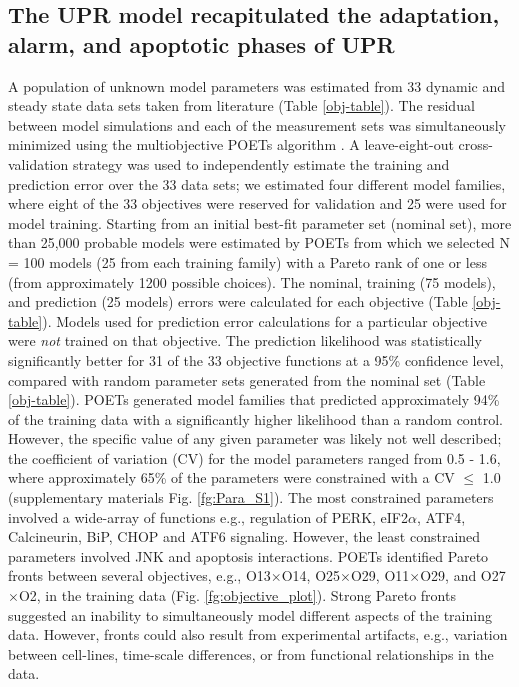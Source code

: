 \documentclass[fleqn,10pt]{wlscirep}
\begin{document}
\subsection*{The UPR model recapitulated the adaptation, alarm, and apoptotic phases of UPR}
A population of unknown model parameters was estimated from 33 dynamic and steady state data sets taken from literature (Table \ref{obj-table}).
The residual between model simulations and each of the measurement sets was simultaneously minimized using the multiobjective POETs algorithm \cite{Song:2010ij}.
A leave-eight-out cross-validation strategy was used to independently estimate the training and prediction error over the 33 data sets; we estimated four different model families,
where eight of the 33 objectives were reserved for validation and 25 were used for model training.
Starting from an initial best-fit parameter set (nominal set), more than 25,000 probable models were estimated by POETs from which we selected N = 100 models (25 from each training family) with a Pareto rank of one or less (from approximately 1200 possible choices).
The nominal, training (75 models), and prediction (25 models) errors were calculated for each objective (Table \ref{obj-table}).
Models used for prediction error calculations for a particular objective were \emph{not} trained on that objective.
The prediction likelihood was statistically significantly better for 31 of the 33 objective functions at a 95\% confidence level, compared with random parameter sets generated from the nominal set (Table \ref{obj-table}).
POETs generated model families that predicted approximately 94\% of the training data with a significantly higher likelihood than a random control.
However, the specific value of any given parameter was likely not well described; the coefficient of variation (CV) for the model parameters ranged from 0.5 - 1.6, where approximately 65\% of the parameters were constrained with a CV $\leq$ 1.0 (supplementary materials Fig. \ref{fg:Para_S1}).
The most constrained parameters involved a wide-array of functions e.g., regulation of PERK, eIF2$\alpha$, ATF4, Calcineurin, BiP, CHOP and ATF6 signaling.
However, the least constrained parameters involved JNK and apoptosis interactions.
POETs identified Pareto fronts between several objectives, e.g., O13$\times$O14, O25$\times$O29, O11$\times$O29, and O27$\times$O2, in the training data  (Fig. \ref{fg:objective_plot}).
Strong Pareto fronts suggested an inability to simultaneously model different aspects of the training data.
However, fronts could also result from experimental artifacts, e.g., variation between cell-lines, time-scale differences, or from functional relationships in the data.
\end{document}
